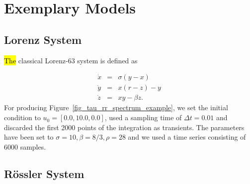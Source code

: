 \documentclass[entropy,article,accept,pdftex,moreauthors]{Definitions/mdpi}
\begin{document}

\vspace{-6pt}

\appendixstart
\appendix

\section{Exemplary Models}
 
\subsection{Lorenz System}\label{sec_models_lorenz63}

\hl{The} classical Lorenz-63 system \cite{lorenz1963} is defined as

\begin{equation}
\begin{array}{rcl}
\dot{x}&=&\sigma(y-x) \\
\dot{y}&=&x(r-z)-y \\
\dot{z}&=&xy - \beta z.
\end{array}
\label{eq_model_Lorenz63}
\end{equation}
{For} producing Figure~\ref{fig_tau_rr_spectrum_example}, we set the initial condition to $u_0=[0.0, 10.0, 0.0]$, used a sampling time of $\Delta t=0.01$ and discarded the first 
2000 points of the integration as transients. The parameters have been set to 
$\sigma=10, \beta=8/3, \rho=28$ and we used a time series consisting of 6000 samples.

\subsection{R\"ossler System}\label{sec_models_roessler}
\end{document}
